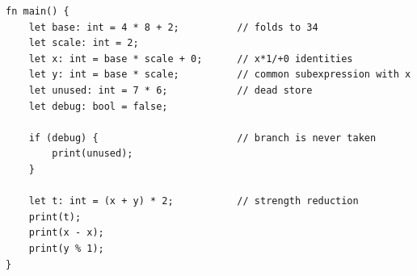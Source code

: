 \begin{lstlisting}[language=nova,]
fn main() {
    let base: int = 4 * 8 + 2;          // folds to 34
    let scale: int = 2;
    let x: int = base * scale + 0;      // x*1/+0 identities
    let y: int = base * scale;          // common subexpression with x
    let unused: int = 7 * 6;            // dead store
    let debug: bool = false;

    if (debug) {                        // branch is never taken
        print(unused);
    }

    let t: int = (x + y) * 2;           // strength reduction
    print(t);
    print(x - x);
    print(y % 1);
}
\end{lstlisting}
